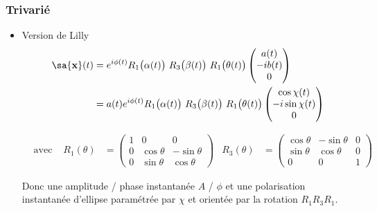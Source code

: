 \subsubsection{Trivarié}

\begin{itemize}
	\item Version de Lilly \cite{lilly_modulated_2011}
	\begin{equation}
		\begin{aligned}
			\sa{\bf{x}}(t) &= e^{i\phi(t)} R_1\big(\alpha(t)\big)\ R_3\big(\beta(t)\big)\ R_1\big(\theta(t)\big)\begin{pmatrix}
				a(t) \\ -ib(t) \\ 0
			\end{pmatrix} \\
			&= a(t)e^{i\phi(t)} R_1\big(\alpha(t)\big)\ R_3\big(\beta(t)\big)\ R_1\big(\theta(t)\big)\begin{pmatrix}
				\cos\chi(t) \\ -i\sin\chi(t) \\ 0
			\end{pmatrix}
		\end{aligned}
	\end{equation}
	
	\begin{align*}
		&\text{avec : }  &  
		R_1(\theta) &= \begin{pmatrix}
			1 & 0 & 0 \\ 0 & \cos\theta & -\sin\theta \\ 0 & \sin\theta & \cos\theta
		\end{pmatrix}  &  
		R_3(\theta) &= \begin{pmatrix}
			\cos\theta & -\sin\theta & 0 \\ \sin\theta & \cos\theta & 0 \\ 0 & 0 & 1 
		\end{pmatrix}
	\end{align*}
	
	Donc une amplitude / phase instantanée $A$ / $\phi$ et une polarisation instantanée d'ellipse paramétrée par $\chi$ et orientée par la rotation $R_1R_3R_1$.
	

\end{itemize}
